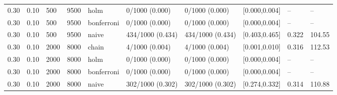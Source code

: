 \documentclass{ieeeaccess}
\begin{document}
\begin{table}[p]
\begin{tabular}{@{}llllllllll@{}}
0.30 & 0.10 & 500 & 9500 & holm & 0/1000 (0.000) & 0/1000 (0.000) & [0.000,0.004] & -- & -- \\
0.30 & 0.10 & 500 & 9500 & bonferroni & 0/1000 (0.000) & 0/1000 (0.000) & [0.000,0.004] & -- & -- \\
0.30 & 0.10 & 500 & 9500 & naive & 434/1000 (0.434) & 434/1000 (0.434) & [0.403,0.465] & 0.322 & 104.55 \\
0.30 & 0.10 & 2000 & 8000 & chain & 4/1000 (0.004) & 4/1000 (0.004) & [0.001,0.010] & 0.316 & 112.53 \\
0.30 & 0.10 & 2000 & 8000 & holm & 0/1000 (0.000) & 0/1000 (0.000) & [0.000,0.004] & -- & -- \\
0.30 & 0.10 & 2000 & 8000 & bonferroni & 0/1000 (0.000) & 0/1000 (0.000) & [0.000,0.004] & -- & -- \\
0.30 & 0.10 & 2000 & 8000 & naive & 302/1000 (0.302) & 302/1000 (0.302) & [0.274,0.332] & 0.314 & 110.88 \\
\bottomrule
\end{tabular}
\end{table}
\end{document}
